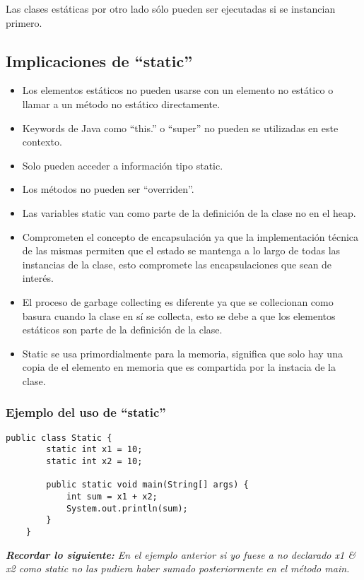 \documentclass{article}
\begin{document}
Las clases estáticas por otro lado sólo pueden ser ejecutadas si se instancian primero. \newline 

\subsection{Implicaciones de ``static''}
\begin{itemize}
    \item Los elementos estáticos no pueden usarse con un elemento no estático o llamar a un método no estático directamente.
    \item Keywords de Java como ``this.'' o ``super'' no pueden se utilizadas en este contexto.
    \item Solo pueden acceder a información tipo static.
    \item Los métodos no pueden ser ``overriden''.
    \item Las variables static van como parte de la definición de la clase no en el heap.
    \item Comprometen el concepto de encapsulación ya que la implementación técnica de las mismas permiten que el estado se mantenga a lo largo de todas las instancias de la clase, esto compromete las encapsulaciones que sean de interés.
    \item El proceso de garbage collecting es diferente ya que se collecionan como basura cuando la clase en sí se collecta, esto se debe a que los elementos estáticos son parte de la definición de la clase.
    \item Static se usa primordialmente para la memoria, significa que solo hay una copia de el elemento en memoria que es compartida por la instacia de la clase.
\end{itemize}

\subsubsection{Ejemplo del uso de ``static''}
\begin{Verbatim}[breaklines=true, breakanywhere=true]
    public class Static {
        static int x1 = 10;
        static int x2 = 10;

        public static void main(String[] args) {
            int sum = x1 + x2;
            System.out.println(sum);
        }
    }
\end{Verbatim}
\emph{\textbf{Recordar lo siguiente: }En el ejemplo anterior si yo fuese a no declarado x1 \& x2 como static no las pudiera haber sumado posteriormente en el método main.}
\end{document}
